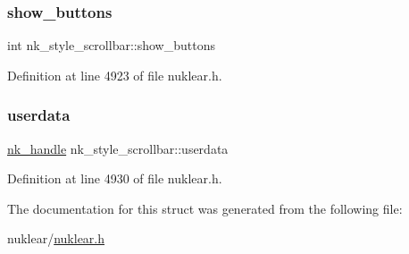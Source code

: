 \subsubsection{\texorpdfstring{show\+\_\+buttons}{show\_buttons}}
{\footnotesize\ttfamily int nk\+\_\+style\+\_\+scrollbar\+::show\+\_\+buttons}



Definition at line 4923 of file nuklear.\+h.

\mbox{\label{structnk__style__scrollbar_a9ffd74fad1ee2f9b293693ebd77f1110}} 
\subsubsection{\texorpdfstring{userdata}{userdata}}
{\footnotesize\ttfamily \mbox{\hyperlink{unionnk__handle}{nk\+\_\+handle}} nk\+\_\+style\+\_\+scrollbar\+::userdata}



Definition at line 4930 of file nuklear.\+h.



The documentation for this struct was generated from the following file\+:\begin{DoxyCompactItemize}
\item 
nuklear/\mbox{\hyperlink{nuklear_8h}{nuklear.\+h}}\end{DoxyCompactItemize}
